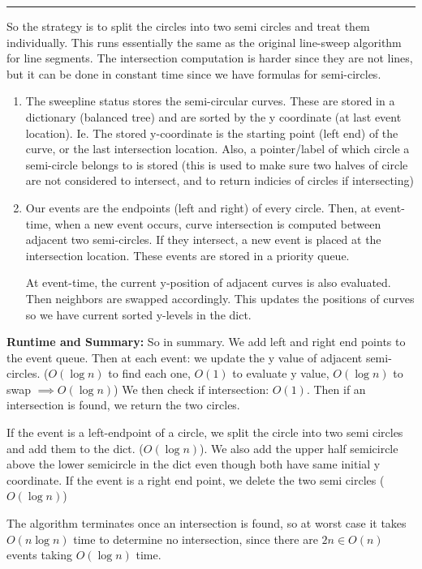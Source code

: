 \documentclass[11pt]{article}
\begin{document}
\hrule


So the strategy is to split the circles into two semi circles and treat them individually.
This runs essentially the same as the original line-sweep algorithm for line segments.
The intersection computation is harder since they are not lines, but it can be done in constant time since we have formulas for semi-circles.

\begin{enumerate}[(1)]
    \item The sweepline status stores the semi-circular curves.
        These are stored in a dictionary (balanced tree) and are sorted by the y coordinate (at last event location).
        Ie. The stored y-coordinate is the starting point (left end) of the curve, or the last intersection location.
        Also, a pointer/label of which circle a semi-circle belongs to is stored 
        (this is used to make sure two halves of circle are not considered to intersect, and to return indicies of circles if intersecting)

    \item Our events are the endpoints (left and right) of every circle. 
    Then, at event-time, when a new event occurs, curve intersection is computed between adjacent 
    two semi-circles. If they intersect, a new event is placed at the intersection location. 
    These events are stored in a priority queue. 

    At event-time, the current y-position of adjacent curves is also evaluated. Then neighbors are swapped accordingly.
    This updates the positions of curves so we have current sorted y-levels in the dict. 
\end{enumerate}


\textbf{Runtime and Summary: }So in summary. We add left and right end points to the event queue. 
Then at each event: we update the y value of adjacent semi-circles. 
($O(\log n)$ to find each one, $O(1)$ to evaluate y value, $O(\log n)$ to swap $\implies O(\log n)$)
We then check if intersection: $O(1)$. Then if an intersection is found, we return the two circles.

If the event is a left-endpoint of a circle, we split the circle into two semi circles and add them to the dict.
($O(\log n)$). We also add the upper half semicircle above the lower semicircle in the dict even though both have same initial y coordinate.
If the event is a right end point, we delete the two semi circles ($O(\log n)$)

The algorithm terminates once an intersection is found, so at worst case it takes $O(n \log n)$ time to determine no intersection,
since there are $2n \in O(n)$ events taking $O(\log n)$ time.
\end{document}
